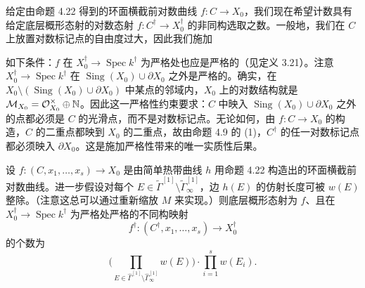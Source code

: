给定由命题 4.22 得到的环面横截前对数曲线 $f:C\to X_0$，我们现在希望计数具有给定底层概形态射的对数态射 $f:C^\dagger\to X_0^\dagger$ 的非同构选取之数。一般地，我们在 $C$ 上放置对数标记点的自由度过大，因此我们施加

如下条件：$f$ 在 $X_0^\dagger\to\operatorname{Spec}k^\dagger$ 为严格处也应是严格的（见定义 3.21）。注意 $X_0^\dagger\to\operatorname{Spec}k^\dagger$ 在 $\operatorname{Sing}(X_0)\cup\partial X_0$ 之外是严格的。确实，在 $X_0\setminus(\operatorname{Sing}(X_0)\cup\partial X_0)$ 中某点的邻域内，$X_0$ 上的对数结构就是 $\mathcal{M}_{X_0}=\mathcal{O}_{X_0}^\times\oplus\mathbb{N}$。因此这一严格性约束要求：$C$ 中映入 $\operatorname{Sing}(X_0)\cup\partial X_0$ 之外的点都必须是 $C$ 的光滑点，而不是对数标记点。无论如何，由 $f:C\to X_0$ 的构造，$C$ 的二重点都映到 $X_0$ 的二重点，故由命题 4.9 的 (1)，$C^\dagger$ 的任一对数标记点都必须映入 $\partial X_0$。这是施加严格性带来的唯一实质性后果。

\begin{proposition}
设 $f:(C,x_1,\dots,x_s)\to X_0$ 是由简单热带曲线 $h$ 用命题 4.22 构造出的环面横截前对数曲线。进一步假设对每个 $E\in\tilde\Gamma^{[1]}\setminus\tilde\Gamma^{[1]}_\infty$，边 $h(E)$ 的仿射长度可被 $w(E)$ 整除。（注意这总可以通过重新缩放 $M$ 来实现。）则底层概形态射为 $f$、且在 $X_0^\dagger\to\operatorname{Spec}k^\dagger$ 为严格处严格的不同构映射
\[
f^\dagger:(C^\dagger,x_1,\dots,x_s)\to X_0^\dagger
\]
的个数为
\[
\Big(\prod_{E\in\hat\Gamma^{[1]}\setminus\hat\Gamma^{[1]}_\infty}w(E)\Big)\cdot\prod_{i=1}^sw(E_i).
\]
\end{proposition}

